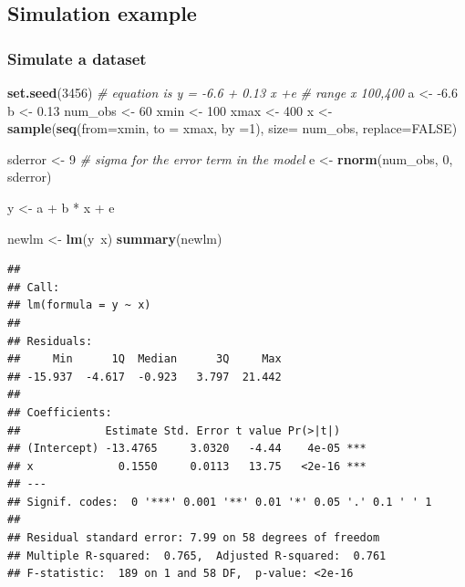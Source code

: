 \documentclass[]{book}
\newenvironment{Shaded}{\begin{snugshade}}{\end{snugshade}}
\newcommand{\KeywordTok}[1]{\textcolor[rgb]{0.13,0.29,0.53}{\textbf{{#1}}}}
\newcommand{\DataTypeTok}[1]{\textcolor[rgb]{0.13,0.29,0.53}{{#1}}}
\newcommand{\DecValTok}[1]{\textcolor[rgb]{0.00,0.00,0.81}{{#1}}}
\newcommand{\FloatTok}[1]{\textcolor[rgb]{0.00,0.00,0.81}{{#1}}}
\newcommand{\StringTok}[1]{\textcolor[rgb]{0.31,0.60,0.02}{{#1}}}
\newcommand{\CommentTok}[1]{\textcolor[rgb]{0.56,0.35,0.01}{\textit{{#1}}}}
\newcommand{\OtherTok}[1]{\textcolor[rgb]{0.56,0.35,0.01}{{#1}}}
\newcommand{\NormalTok}[1]{{#1}}
\begin{document}
\subsection{Simulation example}\label{simulation-example}

\subsubsection{Simulate a dataset}\label{simulate-a-dataset}

\begin{Shaded}
\begin{Highlighting}[]
\KeywordTok{set.seed}\NormalTok{(}\DecValTok{3456}\NormalTok{)}
\CommentTok{# equation is  y = -6.6 + 0.13 x +e}
\CommentTok{# range x 100,400}
\NormalTok{a <-}\StringTok{ }\NormalTok{-}\FloatTok{6.6}
\NormalTok{b <-}\StringTok{ }\FloatTok{0.13}
\NormalTok{num_obs <-}\StringTok{ }\DecValTok{60}
\NormalTok{xmin <-}\StringTok{ }\DecValTok{100}
\NormalTok{xmax <-}\StringTok{ }\DecValTok{400}
\NormalTok{x <-}\StringTok{ }\KeywordTok{sample}\NormalTok{(}\KeywordTok{seq}\NormalTok{(}\DataTypeTok{from=}\NormalTok{xmin, }\DataTypeTok{to =} \NormalTok{xmax, }\DataTypeTok{by =}\DecValTok{1}\NormalTok{), }\DataTypeTok{size=} \NormalTok{num_obs, }\DataTypeTok{replace=}\OtherTok{FALSE}\NormalTok{)}

\NormalTok{sderror <-}\StringTok{ }\DecValTok{9} \CommentTok{# sigma for the error term in the model}
\NormalTok{e <-}\StringTok{ }\KeywordTok{rnorm}\NormalTok{(num_obs, }\DecValTok{0}\NormalTok{, sderror) }

\NormalTok{y <-}\StringTok{ }\NormalTok{a +}\StringTok{ }\NormalTok{b *}\StringTok{ }\NormalTok{x +}\StringTok{ }\NormalTok{e}


\NormalTok{newlm <-}\StringTok{ }\KeywordTok{lm}\NormalTok{(y~x)}
\KeywordTok{summary}\NormalTok{(newlm)}
\end{Highlighting}
\end{Shaded}

\begin{verbatim}
## 
## Call:
## lm(formula = y ~ x)
## 
## Residuals:
##     Min      1Q  Median      3Q     Max 
## -15.937  -4.617  -0.923   3.797  21.442 
## 
## Coefficients:
##             Estimate Std. Error t value Pr(>|t|)    
## (Intercept) -13.4765     3.0320   -4.44    4e-05 ***
## x             0.1550     0.0113   13.75   <2e-16 ***
## ---
## Signif. codes:  0 '***' 0.001 '**' 0.01 '*' 0.05 '.' 0.1 ' ' 1
## 
## Residual standard error: 7.99 on 58 degrees of freedom
## Multiple R-squared:  0.765,  Adjusted R-squared:  0.761 
## F-statistic:  189 on 1 and 58 DF,  p-value: <2e-16
\end{verbatim}
\end{document}
